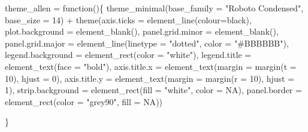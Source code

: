 \documentclass[
  letterpaper,
  DIV=11,
  numbers=noendperiod,
  oneside]{scrreprt}
\newenvironment{Shaded}{\begin{snugshade}}{\end{snugshade}}
\newcommand{\AttributeTok}[1]{\textcolor[rgb]{0.40,0.45,0.13}{#1}}
\newcommand{\ConstantTok}[1]{\textcolor[rgb]{0.56,0.35,0.01}{#1}}
\newcommand{\ControlFlowTok}[1]{\textcolor[rgb]{0.00,0.23,0.31}{#1}}
\newcommand{\DecValTok}[1]{\textcolor[rgb]{0.68,0.00,0.00}{#1}}
\newcommand{\FunctionTok}[1]{\textcolor[rgb]{0.28,0.35,0.67}{#1}}
\newcommand{\NormalTok}[1]{\textcolor[rgb]{0.00,0.23,0.31}{#1}}
\newcommand{\OtherTok}[1]{\textcolor[rgb]{0.00,0.23,0.31}{#1}}
\newcommand{\SpecialCharTok}[1]{\textcolor[rgb]{0.37,0.37,0.37}{#1}}
\newcommand{\StringTok}[1]{\textcolor[rgb]{0.13,0.47,0.30}{#1}}
\begin{document}
\begin{Shaded}
\begin{Highlighting}[]
\NormalTok{theme\_allen }\OtherTok{=} \ControlFlowTok{function}\NormalTok{()\{}
  \FunctionTok{theme\_minimal}\NormalTok{(}\AttributeTok{base\_family =} \StringTok{"Roboto Condensed"}\NormalTok{, }
                \AttributeTok{base\_size =} \DecValTok{14}\NormalTok{)  }\SpecialCharTok{+}
    \FunctionTok{theme}\NormalTok{(}\AttributeTok{axis.ticks =} \FunctionTok{element\_line}\NormalTok{(}\AttributeTok{colour=}\StringTok{\textquotesingle{}black\textquotesingle{}}\NormalTok{),}
          \AttributeTok{plot.background =} \FunctionTok{element\_blank}\NormalTok{(),}
          \AttributeTok{panel.grid.minor =} \FunctionTok{element\_blank}\NormalTok{(),}
          \AttributeTok{panel.grid.major =} \FunctionTok{element\_line}\NormalTok{(}\AttributeTok{linetype =} \StringTok{"dotted"}\NormalTok{, }
                                          \AttributeTok{color =} \StringTok{"\#BBBBBB"}\NormalTok{),}
          \AttributeTok{legend.background =} \FunctionTok{element\_rect}\NormalTok{(}\AttributeTok{color =} \StringTok{"white"}\NormalTok{),}
          \AttributeTok{legend.title =} \FunctionTok{element\_text}\NormalTok{(}\AttributeTok{face =} \StringTok{"bold"}\NormalTok{),}
          \AttributeTok{axis.title.x =} \FunctionTok{element\_text}\NormalTok{(}\AttributeTok{margin =} \FunctionTok{margin}\NormalTok{(}\AttributeTok{t =} \DecValTok{10}\NormalTok{), }\AttributeTok{hjust =} \DecValTok{0}\NormalTok{),}
          \AttributeTok{axis.title.y =} \FunctionTok{element\_text}\NormalTok{(}\AttributeTok{margin =} \FunctionTok{margin}\NormalTok{(}\AttributeTok{r =} \DecValTok{10}\NormalTok{), }\AttributeTok{hjust =} \DecValTok{1}\NormalTok{),}
          \AttributeTok{strip.background =} \FunctionTok{element\_rect}\NormalTok{(}\AttributeTok{fill =} \StringTok{"white"}\NormalTok{, }\AttributeTok{color =} \ConstantTok{NA}\NormalTok{),}
          \AttributeTok{panel.border =} \FunctionTok{element\_rect}\NormalTok{(}\AttributeTok{color =} \StringTok{"grey90"}\NormalTok{, }\AttributeTok{fill =} \ConstantTok{NA}\NormalTok{))}
  
\NormalTok{\}}
\end{Highlighting}
\end{Shaded}

\end{document}
